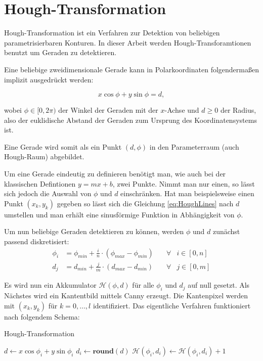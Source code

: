 \section{Hough-Transformation}
\label{s:hough}
Hough-Transformation ist ein Verfahren zur Detektion von beliebigen parametrisierbaren Konturen. In dieser Arbeit werden Hough-Transforamtionen benutzt um Geraden zu detektieren. 

Eine beliebige zweidimensionale Gerade kann in Polarkoordinaten folgendermaßen implizit ausgedrückt werden:

\begin{equation}\label{eq:HoughLines}
x\cos\phi + y\sin\phi = d,
\end{equation}

wobei $\phi \in [0,2\pi)$ der Winkel der Geraden mit der $x$-Achse und $d \geq 0$ der Radius, also der euklidische Abstand der Geraden zum Ursprung des Koordinatensystems ist.

Eine Gerade wird somit als ein Punkt $(d,\phi)$ in den Parameterraum (auch Hough-Raum) abgebildet. 

Um eine Gerade eindeutig zu definieren benötigt man, wie auch bei der klassischen Defintionen $y = mx + b$, zwei Punkte. Nimmt man nur einen, so lässt sich jedoch die Auswahl von $\phi$ und $d$ einschränken. Hat man beispielsweise einen Punkt $(x_k,y_k)$ gegeben so lässt sich die Gleichung \ref{eq:HoughLines} nach $d$ umstellen und man erhält eine sinusförmige Funktion in Abhängigkeit von $\phi$. 

Um nun beliebige Geraden detektieren zu können, werden $\phi$ und $d$ zunächst passend diskretisiert:
\[
	\begin{aligned}
		\phi_i &= \phi_{min} + \frac{i}{n} \cdot (\phi_{max} - \phi_{min}) \quad&\forall &i\in [0,n]\\
		d_j &= d_{min} + \frac{j}{m} \cdot  (d_{max} - d_{min}) &\forall &j\in [0,m]
	\end{aligned}
\]



Es wird nun ein Akkumulator $\mathcal{H}(\phi, d)$ für alle $\phi_i$ und $d_j$ auf null gesetzt.
Als Nächstes wird ein Kantentbild mittels Canny \cite{Canny1986} erzeugt. Die Kantenpixel werden mit $(x_k,y_k)$ für $k = 0,\dotsc,l$ identifiziert. Das eigentliche Verfahren funktioniert nach folgendem Schema:

\begin{algorithm}
	\caption{Hough-Transformation}\label{euclid}
	\begin{algorithmic}[1]
		 
		 
		\State $d \gets x\cos\phi_i + y\sin\phi_i$
		\State $d_i \gets \textbf{round}(d)$ 
		\State  $\mathcal{H}(\phi_i, d_i) \gets \mathcal{H}(\phi_i, d_i) + 1$
		\EndFor
		\EndFor
	\end{algorithmic}
\end{algorithm}

